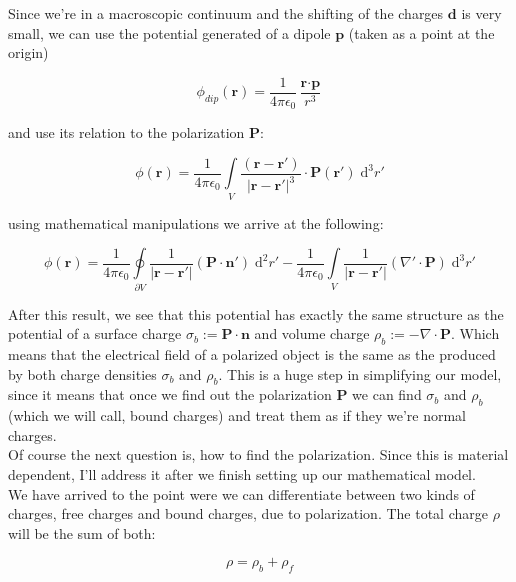 Since we're in a macroscopic continuum and the shifting of the charges $\textbf{d}$ is very small, we can use the potential generated of a dipole $\textbf{p}$ (taken as a point at the origin)

\begin{equation}
\phi_{dip}(\textbf{r}) = \frac{1}{4\pi\epsilon_0} \frac{\textbf{r}\cdot\textbf{p}}{r^3}
\end{equation} 

and use its relation to the polarization $\textbf{P}$:

\begin{equation}\label{eq:dipolpot}
 \phi(\textbf{r})=\frac{1}{4\pi\epsilon_0}\int\limits_V \frac{(\textbf{r}-\textbf{r}')}{|\textbf{r}-\textbf{r}'|^3}\cdot\textbf{P}(\textbf{r}')\; \mathrm{d}^3r'
\end{equation} 

using mathematical manipulations we arrive at the following:

\begin{equation}\label{eq:dipolpotexp}
 \phi(\textbf{r}) = \frac{1}{4\pi\epsilon_0} \oint\limits_{\partial V} \frac{1}{|\textbf{r}-\textbf{r}'|}(\textbf{P}\cdot \textbf{n}')\;\mathrm{d}^2r' - \frac{1}{4\pi\epsilon_0} \int\limits_V \frac{1}{|\textbf{r}-\textbf{r}'|}(\nabla'\cdot\textbf{P})\;\mathrm{d}^3r'
\end{equation} 

After this result, we see that this potential has exactly the same structure as the potential of a surface charge $\sigma_b := \textbf{P}\cdot\textbf{n}$ and volume charge $\rho_b := -\nabla\cdot\textbf{P}$. Which means that the electrical field of a polarized object is the same as the produced by both charge densities $\sigma_b$ and $\rho_b$. This is a huge step in simplifying our model, since it means that once we find out the polarization $\textbf{P}$ we can find $\sigma_b$ and $\rho_b$ (which we will call, bound charges) and treat them as if they we're normal charges.\\

Of course the next question is, how to find the polarization. Since this is material dependent, I'll address it after we finish setting up our mathematical model.\\

We have arrived to the point were we can differentiate between two kinds of charges, free charges and bound charges, due to polarization. The total charge $\rho$ will be the sum of both:

\begin{equation}
\rho = \rho_b + \rho_f
\end{equation}

